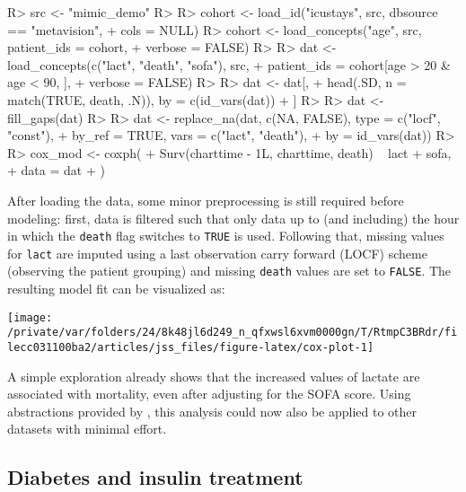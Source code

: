 \documentclass[
  notitle,
  nojss,
  noheadings]{jss}
\begin{document}
\begin{CodeChunk}
\begin{CodeInput}
R> src <- "mimic_demo"
R> 
R> cohort <- load_id("icustays", src, dbsource == "metavision",
+                   cols = NULL)
R> cohort <- load_concepts("age", src, patient_ids = cohort,
+                         verbose = FALSE)
R> 
R> dat <- load_concepts(c("lact", "death", "sofa"), src,
+                      patient_ids = cohort[age > 20 & age < 90, ],
+                      verbose = FALSE)
R> 
R> dat <- dat[,
+   head(.SD, n = match(TRUE, death, .N)), by = c(id_vars(dat))
+ ]
R> 
R> dat <- fill_gaps(dat)
R> 
R> dat <- replace_na(dat, c(NA, FALSE), type = c("locf", "const"),
+                   by_ref = TRUE, vars = c("lact", "death"),
+                   by = id_vars(dat))
R> 
R> cox_mod <- coxph(
+   Surv(charttime - 1L, charttime, death) ~ lact + sofa,
+   data = dat
+ )
\end{CodeInput}
\end{CodeChunk}

After loading the data, some minor preprocessing is still required
before modeling: first, data is filtered such that only data up to (and
including) the hour in which the \texttt{death} flag switches to
\texttt{TRUE} is used. Following that, missing values for \texttt{lact}
are imputed using a last observation carry forward (LOCF) scheme
(observing the patient grouping) and missing \texttt{death} values are
set to \texttt{FALSE}. The resulting model fit can be visualized as:

\begin{CodeChunk}


\begin{center}\texttt{[image: /private/var/folders/24/8k48jl6d249\_n\_qfxwsl6xvm0000gn/T/RtmpC3BRdr/filecc031100ba2/articles/jss\_files/figure-latex/cox-plot-1]} \end{center}

\end{CodeChunk}

A simple exploration already shows that the increased values of lactate
are associated with mortality, even after adjusting for the SOFA score.
Using abstractions provided by , this analysis could now also
be applied to other datasets with minimal effort.

\hypertarget{diabetes-and-insulin-treatment}{%
\subsection{Diabetes and insulin
treatment}\label{diabetes-and-insulin-treatment}}
\end{document}
